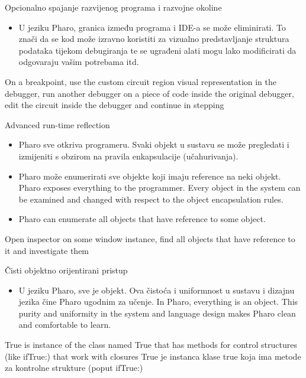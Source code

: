 \documentclass{beamer}
\begin{document}
\begin{frame}{Opcionalno spajanje razvijenog programa i razvojne okoline}
\begin{itemize}
    \item U jeziku Pharo, granica između programa i IDE-a se može eliminirati. To znači da se kod može izravno koristiti za vizualno predstavljanje struktura podataka tijekom debugiranja te se ugrađeni alati mogu lako modificirati da odgovaraju vašim potrebama itd.
\end{itemize}
\begin{block}{}

On a breakpoint, use the custom circuit region visual representation in the debugger, run another debugger on a piece of code inside the original debugger, edit the circuit inside the debugger and continue in stepping
\end{block}
\end{frame}

\begin{frame}{Advanced run-time reflection}
\begin{itemize}
    \item Pharo sve otkriva programeru. Svaki objekt u sustavu se može pregledati i izmijeniti s obzirom na pravila enkapsulacije (učahurivanja).
    \item Pharo može enumerirati sve objekte koji imaju reference na neki objekt.
    Pharo exposes everything to the programmer. Every object in the system can be examined and changed with respect to the object encapsulation rules.
    \item Pharo can enumerate all objects that have reference to some object.
\end{itemize}
\begin{block}{}
Open inspector on some window instance, find all objects that have reference to it and investigate them
\end{block}
\end{frame}

\begin{frame}{Čisti objektno orijentirani pristup}
\begin{itemize}
    \item U jeziku Pharo, sve je objekt. Ova čistoća i uniformnost u sustavu i dizajnu jezika čine Pharo ugodnim za učenje. In Pharo, everything is an object. This purity and uniformity in the system and language design makes Pharo clean and comfortable to learn.
\end{itemize}
\begin{block}{}
True is instance of the class named True that has methods for control structures (like ifTrue:) that work with closures
True je instanca klase true koja ima metode za kontrolne strukture (poput ifTrue:) 
\end{block}
\end{frame}
\end{document}
